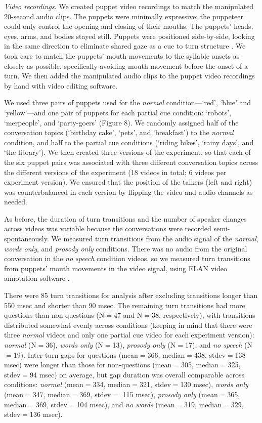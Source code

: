 \documentclass[authoryear, 12pt]{elsarticle}
\begin{document}
\textit{Video recordings}. We created puppet video recordings to match the manipulated 20-second audio clips. The puppets were minimally expressive; the puppeteer could only control the opening and closing of their mouths. The puppets' heads, eyes, arms, and bodies stayed still. Puppets were positioned side-by-side, looking in the same direction to eliminate shared gaze as a cue to turn structure \citep{thorgrimsson2015}. We took care to match the puppets' mouth movements to the syllable onsets as closely as possible, specifically avoiding mouth movement before the onset of a turn. We then added the manipulated audio clips to the puppet video recordings by hand with video editing software.

We used three pairs of puppets used for the \textit{normal} condition---`red', `blue' and `yellow'---and one pair of puppets for each partial cue condition: `robots', `merpeople', and `party-goers' (Figure 8). We randomly assigned half of the conversation topics (`birthday cake', `pets', and `breakfast') to the \textit{normal} condition, and half to the partial cue conditions (`riding bikes', `rainy days', and `the library'). We then created three versions of the experiment, so that each of the six puppet pairs was associated with three different conversation topics across the different versions of the experiment (18 videos in total; 6 videos per experiment version). We ensured that the position of the talkers (left and right) was counterbalanced in each version by flipping the video and audio channels as needed.

As before, the duration of turn transitions and the number of speaker changes across videos was variable because the conversations were recorded semi-spontaneously. We measured turn transitions from the audio signal of the \textit{normal}, \textit{words only}, and \textit{prosody only} conditions. There was no audio from the original conversation in the \textit{no speech} condition videos, so we measured turn transitions from puppets' mouth movements in the video signal, using ELAN video annotation software \citep{ELAN}.

There were 85 turn transitions for analysis after excluding transitions longer than 550 msec and shorter than 90 msec. The remaining turn transitions had more questions than non-questions (N$=$47 and N$=$38, respectively), with transitions distributed somewhat evenly across conditions (keeping in mind that there were three \textit{normal} videos and only one partial cue video for each experiment version): \textit{normal} (N$=$36), \textit{words only} (N$=$13), \textit{prosody only} (N$=$17), and \textit{no speech} (N$=$19). Inter-turn gaps for questions (mean$=$366, median$=$438, stdev$=$138 msec) were longer than those for non-questions (mean$=$305, median$=$325, stdev$=$94 msec) on average, but gap duration was overall comparable across conditions: \textit{normal} (mean$=$334, median$=$321, stdev$=$130 msec), \textit{words only} (mean$=$347, median$=$369, stdev$=$ 115 msec), \textit{prosody only} (mean$=$365, median$=$369, stdev$=$104 msec), and \textit{no words} (mean$=$319, median$=$329, stdev$=$136 msec).
\end{document}
